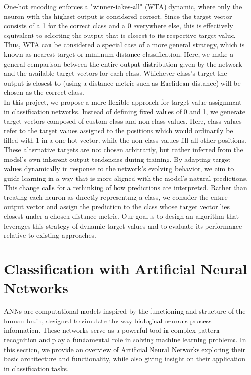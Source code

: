 \documentclass[12pt,fleqn,a4paper]{article}
\begin{document}
One-hot encoding enforces a "winner-takes-all" (WTA) dynamic, where only the neuron with the highest output is considered correct. Since the target vector consists of a 1 for the correct class and a 0 everywhere else, this is effectively equivalent to selecting the output that is closest to its respective target value. Thus, WTA can be considered a special case of a more general strategy, which is known as nearest target or minimum distance classification. Here, we make a general comparison between the entire output distribution given by the network and the available target vectors for each class. Whichever class's target the output is closest to (using a distance metric such as Euclidean distance) will be chosen as the correct class. \\

In this project, we propose a more flexible approach for target value assignment in classification networks. Instead of defining fixed values of 0 and 1, we generate target vectors composed of custom class and non-class values. Here, class values refer to the target values assigned to the positions which would ordinarily be filled with 1 in a one-hot vector, while the non-class values fill all other positions. These alternative targets are not chosen arbitrarily, but rather inferred from the model's own inherent output tendencies during training. By adapting target values dynamically in response to the network's evolving behavior, we aim to guide learning in a way that is more aligned with the model's natural predictions. \\

This change calls for a rethinking of how predictions are interpreted. Rather than treating each neuron as directly representing a class, we consider the entire output vector and assign the prediction to the class whose target vector lies closest under a chosen distance metric. Our goal is to design an algorithm that leverages this strategy of dynamic target values and to evaluate its performance relative to existing approaches. 

\section{Classification with Artificial Neural Networks}\label{sec:class}
ANNs are computational models inspired by the functioning and structure of the human brain, designed to simulate the way biological neurons process information. These networks serve as a powerful tool in complex pattern recognition and play a fundamental role in solving machine learning problems.  In this section, we provide an overview of Artificial Neural Networks exploring their basic architecture and functionality, while also giving insight on their application in classification tasks.
\end{document}
